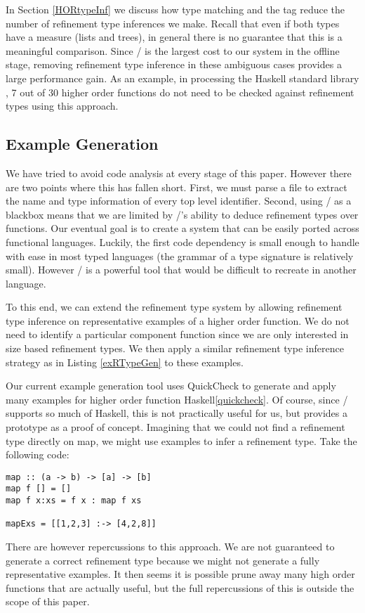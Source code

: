 In Section \ref{HORtypeInf} we discuss how type matching and the  tag reduce the number of refinement type inferences we make. Recall that even if both types have a measure (lists and trees), in general there is no guarantee that this is a meaningful comparison. Since \lhask/ is the largest cost to our system in the offline stage, removing refinement type inference in these ambiguous cases provides a large performance gain. As an example, in processing the Haskell standard library , 7 out of 30 higher order functions do not need to be checked against refinement types using this approach.


\subsection{Example Generation}\label{languageSupport}

We have tried to avoid code analysis at every stage of this paper.
However there are two points where this has fallen short. 
First, we must parse a file to extract the name and type information of every top level identifier. 
Second, using \lhask/ as a blackbox means that we are limited by \lhask/'s ability to deduce refinement types over functions. 
Our eventual goal is to create a system that can be easily ported across functional languages. 
Luckily, the first code dependency is small enough to handle with ease in most typed languages (the grammar of a type signature is relatively small). However \lhask/ is a powerful tool that would be difficult to recreate in another language. 

To this end, we can extend the refinement type system by allowing refinement type inference on representative examples of a higher order function.
We do not need to identify a particular component function since we are only interested in size based refinement types.
We then apply a similar refinement type inference strategy as in Listing \ref{exRTypeGen} to these examples.

Our current example generation tool uses QuickCheck to generate and apply many examples for higher order function Haskell\ref{quickcheck}.
Of course, since \lhask/ supports so much of Haskell, this is not practically useful for us, but provides a prototype as a proof of concept.
Imagining that we could not find a refinement type directly on map, we might use examples to infer a refinement type. Take the following code:

\begin{lstlisting}[numbers=none]
map :: (a -> b) -> [a] -> [b]
map f [] = [] 
map f x:xs = f x : map f xs

mapExs = [[1,2,3] :-> [4,2,8]]
\end{lstlisting}

There are however repercussions to this approach. We are not guaranteed to generate a correct refinement type because we might not generate a fully representative examples. It then seems it is possible prune away many high order functions that are actually useful, but the full repercussions of this is outside the scope of this paper.



